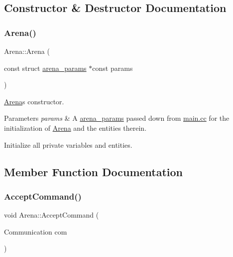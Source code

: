 \subsection{Constructor \& Destructor Documentation}
\mbox{\label{class_arena_ac442d519facc5feebfd7612a53817e9a}} 
\subsubsection{\texorpdfstring{Arena()}{Arena()}}
{\footnotesize\ttfamily Arena\+::\+Arena (\begin{DoxyParamCaption}\item[{const struct \mbox{\hyperlink{structarena__params}{arena\+\_\+params}} $\ast$const}]{params }\end{DoxyParamCaption})\hspace{0.3cm}{\ttfamily [explicit]}}



\mbox{\hyperlink{class_arena}{Arena}}\textquotesingle{}s constructor. 


\begin{DoxyParams}{Parameters}
{\em params} & A \mbox{\hyperlink{structarena__params}{arena\+\_\+params}} passed down from \mbox{\hyperlink{main_8cc}{main.\+cc}} for the initialization of \mbox{\hyperlink{class_arena}{Arena}} and the entities therein.\\
\hline
\end{DoxyParams}
Initialize all private variables and entities. 

\subsection{Member Function Documentation}
\mbox{\label{class_arena_a16fac8e4b2399fcf0db01a9722069c33}} 
\subsubsection{\texorpdfstring{Accept\+Command()}{AcceptCommand()}}
{\footnotesize\ttfamily void Arena\+::\+Accept\+Command (\begin{DoxyParamCaption}\item[{Communication}]{com }\end{DoxyParamCaption})}

